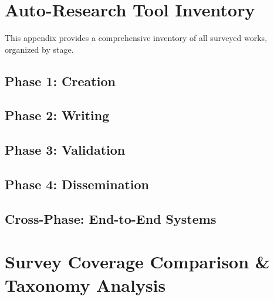 \ifarxivmode
  \beginappendix
\else
  \appendices
\fi

\section{Auto-Research Tool Inventory}
\label{sec:appendix_inventory}

This appendix provides a comprehensive inventory of all surveyed works, organized by stage.

\subsection{Phase 1: Creation}


\clearpage


\clearpage


\clearpage



\clearpage
\subsection{Phase 2: Writing}




\clearpage
\subsection{Phase 3: Validation}



\clearpage



\clearpage
\subsection{Phase 4: Dissemination}




\clearpage
\subsection{Cross-Phase: End-to-End Systems}





\clearpage\clearpage
\clearpage
\section{Survey Coverage Comparison \& Taxonomy Analysis}
\label{sec:appendix_surveys}

